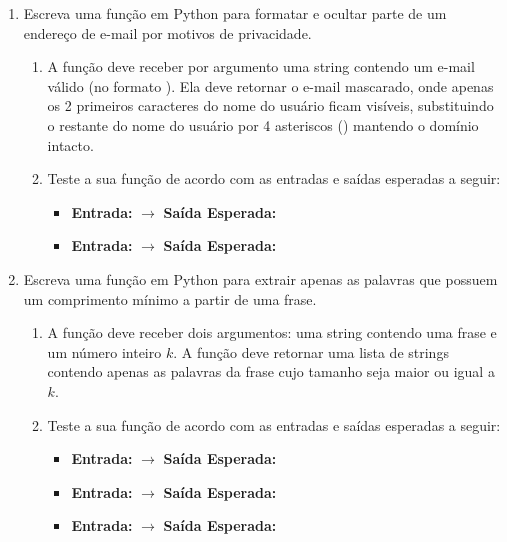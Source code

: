 \begin{enumerate}[label=\textbf{Q\arabic*.}]
    \vspace{0.5cm}
    


    \item Escreva uma função em Python para formatar e ocultar parte de um endereço de e-mail por motivos de privacidade.
    \begin{enumerate}[label=\alph*)]
        \item A função deve receber por argumento uma string contendo um e-mail válido (no formato ). Ela deve retornar o e-mail mascarado, onde apenas os 2 primeiros caracteres do nome do usuário ficam visíveis, substituindo o restante do nome do usuário por 4 asteriscos (\code{****}) mantendo o domínio intacto.
        \item Teste a sua função de acordo com as entradas e saídas esperadas a seguir:
        \begin{itemize}
            \item \textbf{Entrada:}  $\rightarrow$ \textbf{Saída Esperada:} \\
            \item \textbf{Entrada:}  $\rightarrow$ \textbf{Saída Esperada:} 
        \end{itemize}
    \end{enumerate}

    \vspace{0.5cm}
    

    \item Escreva uma função em Python para extrair apenas as palavras que possuem um comprimento mínimo a partir de uma frase.
    \begin{enumerate}[label=\alph*)]
        \item A função deve receber dois argumentos: uma string contendo uma frase e um número inteiro $k$. A função deve retornar uma lista de strings contendo apenas as palavras da frase cujo tamanho seja maior ou igual a $k$.
        \item Teste a sua função de acordo com as entradas e saídas esperadas a seguir:
        \begin{itemize}
            \item \textbf{Entrada:}  $\rightarrow$ \textbf{Saída Esperada:} 
            \item \textbf{Entrada:}  $\rightarrow$ \textbf{Saída Esperada:} 
            \item \textbf{Entrada:}  $\rightarrow$ \textbf{Saída Esperada:} \code{[]}
        \end{itemize}
    \end{enumerate}


\end{enumerate}
